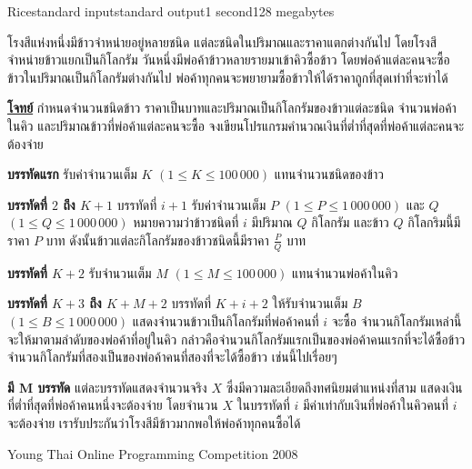 \documentclass[11pt,a4paper]{article}
\begin{document}
\begin{problem}{Rice}{standard input}{standard output}{1 second}{128 megabytes}

โรงสีแห่งหนึ่งมีข้าวจำหน่ายอยู่หลายชนิด แต่ละชนิดในปริมาณและราคาแตกต่างกันไป โดยโรงสีจำหน่ายข้าวแยกเป็นกิโลกรัม วันหนึ่งมีพ่อค้าข้าวหลายรายมาเข้าคิวซื้อข้าว โดยพ่อค้าแต่ละคนจะซื้อข้าวในปริมาณเป็นกิโลกรัมต่างกันไป พ่อค้าทุกคนจะพยายามซื้อข้าวให้ได้ราคาถูกที่สุดเท่าที่จะทำได้

\bigskip
\underline{\textbf{โจทย์}}  กำหนดจำนวนชนิดข้าว ราคาเป็นบาทและปริมาณเป็นกิโลกรัมของข้าวแต่ละชนิด จำนวนพ่อค้าในคิว และปริมาณข้าวที่พ่อค้าแต่ละคนจะซื้อ จงเขียนโปรแกรมคำนวณเงินที่ต่ำที่สุดที่พ่อค้าแต่ละคนจะต้องจ่าย

\InputFile

\textbf{บรรทัดแรก} รับค่าจำนวนเต็ม $K$ $(1 \leq K \leq 100\,000)$ แทนจำนวนชนิดของข้าว

\textbf{บรรทัดที่ $2$ ถึง $K+1$} บรรทัดที่ $i+1$ รับค่าจำนวนเต็ม $P$ $(1 \leq P \leq 1\,000\,000)$ และ $Q$ $(1 \leq Q \leq  1\,000\,000)$ หมายความว่าข้าวชนิดที่ $i$ มีปริมาณ $Q$ กิโลกรัม และข้าว $Q$ กิโลกริมนี้มีราคา $P$ บาท ดังนั้นข้าวแต่ละกิโลกรัมของข้าวชนิดนี้มีราคา $\frac{P}{Q}$ บาท

\textbf{บรรทัดที่ $K+2$} รับจำนวนเต็ม $M$ $(1 \leq M \leq 100\,000)$ แทนจำนวนพ่อค้าในคิว

\textbf{บรรทัดที่ $K+3$ ถึง $K+M+2$} บรรทัดที่ $K+i+2$ ให้รับจำนวนเต็ม $B$ $(1 \leq B \leq 1\,000\,000)$ แสดงจำนวนข้าวเป็นกิโลกรัมที่พ่อค้าคนที่ $i$ จะซื้อ จำนวนกิโลกรัมเหล่านี้จะให้มาตามลำดับของพ่อค้าที่อยู่ในคิว กล่าวคือจำนวนกิโลกรัมแรกเป็นของพ่อค้าคนแรกที่จะได้ซื้อข้าว จำนวนกิโลกรัมที่สองเป็นของพ่อค้าคนที่สองที่จะได้ซื้อข้าว เช่นนี้ไปเรื่อยๆ

\OutputFile

\textbf{มี M บรรทัด} แต่ละบรรทัดแสดงจำนวนจริง $X$ ซึ่งมีความละเอียดถึงทศนิยมตำแหน่งที่สาม แสดงเงินที่ต่ำที่สุดที่พ่อค้าคนหนึ่งจะต้องจ่าย โดยจำนวน $X$ ในบรรทัดที่ $i$ มีค่าเท่ากับเงินที่พ่อค้าในคิวคนที่ $i$ จะต้องจ่าย เรารับประกันว่าโรงสีมีข้าวมากพอให้พ่อค้าทุกคนซื้อได้

\Examples

\begin{example}
%
\end{example}


\Source

Young Thai Online Programming Competition 2008

\end{problem}
\end{document}
